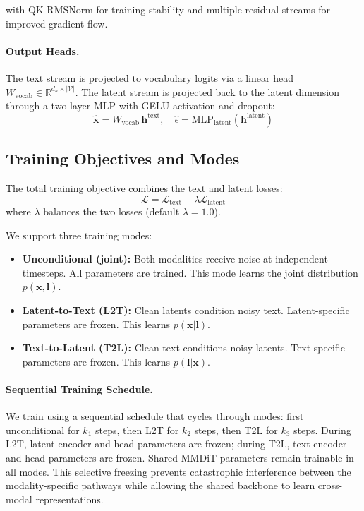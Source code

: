 \documentclass{article}
\begin{document}
with QK-RMSNorm for training stability and multiple residual streams for improved gradient flow.

\paragraph{Output Heads.} The text stream is projected to vocabulary logits via a linear head $W_{\text{vocab}} \in \mathbb{R}^{d_h \times |\mathcal{V}|}$. The latent stream is projected back to the latent dimension through a two-layer MLP with GELU activation and dropout:
\begin{equation}
    \hat{\mathbf{x}} = W_{\text{vocab}} \, \mathbf{h}^{\text{text}}, \quad
    \hat{\epsilon} = \text{MLP}_{\text{latent}}(\mathbf{h}^{\text{latent}})
\end{equation}

\subsection{Training Objectives and Modes}

The total training objective combines the text and latent losses:
\begin{equation}
    \mathcal{L} = \mathcal{L}_{\text{text}} + \lambda \mathcal{L}_{\text{latent}}
\end{equation}
where $\lambda$ balances the two losses (default $\lambda = 1.0$).

We support three training modes:
\begin{itemize}[leftmargin=*]
    \item \textbf{Unconditional (joint):} Both modalities receive noise at independent timesteps. All parameters are trained. This mode learns the joint distribution $p(\mathbf{x}, \mathbf{l})$.
    \item \textbf{Latent-to-Text (L2T):} Clean latents condition noisy text. Latent-specific parameters are frozen. This learns $p(\mathbf{x} | \mathbf{l})$.
    \item \textbf{Text-to-Latent (T2L):} Clean text conditions noisy latents. Text-specific parameters are frozen. This learns $p(\mathbf{l} | \mathbf{x})$.
\end{itemize}

\paragraph{Sequential Training Schedule.} We train using a sequential schedule that cycles through modes: first unconditional for $k_1$ steps, then L2T for $k_2$ steps, then T2L for $k_3$ steps. During L2T, latent encoder and head parameters are frozen; during T2L, text encoder and head parameters are frozen. Shared MMDiT parameters remain trainable in all modes. This selective freezing prevents catastrophic interference between the modality-specific pathways while allowing the shared backbone to learn cross-modal representations.
\end{document}
